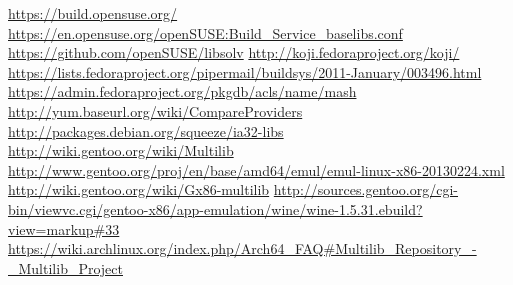 \documentclass[10pt, a5paper]{article}
\begin{document}
\begin{thebibliography}{9}
 \url{https://build.opensuse.org/}
 \url{https://en.opensuse.org/openSUSE:Build\_Service\_baselibs.conf}
 \url{https://github.com/openSUSE/libsolv}
 \url{http://koji.fedoraproject.org/koji/}
 \url{https://lists.fedoraproject.org/pipermail/buildsys/2011-January/003496.html}
 \url{https://admin.fedoraproject.org/pkgdb/acls/name/mash}
 \url{http://yum.baseurl.org/wiki/CompareProviders}
 \url{http://packages.debian.org/squeeze/ia32-libs}
 \url{http://wiki.gentoo.org/wiki/Multilib}
 \url{http://www.gentoo.org/proj/en/base/amd64/emul/emul-linux-x86-20130224.xml}
 \url{http://wiki.gentoo.org/wiki/Gx86-multilib}
 \url{http://sources.gentoo.org/cgi-bin/viewvc.cgi/gentoo-x86/app-emulation/wine/wine-1.5.31.ebuild?view=markup\#33}
 \url{https://wiki.archlinux.org/index.php/Arch64\_FAQ\#Multilib\_Repository\_-\_Multilib\_Project}
\end{thebibliography}
\end{document}
